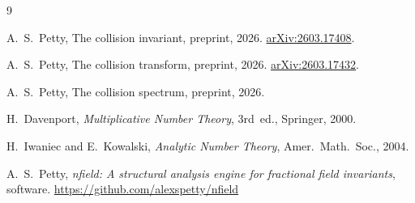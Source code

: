 \documentclass[12pt]{amsart}
\theoremstyle{definition}
\theoremstyle{remark}
\begin{document}
\begin{thebibliography}{9}

A.~S.~Petty,
The collision invariant,
preprint, 2026.
\href{https://arxiv.org/abs/2603.17408}{arXiv:2603.17408}.

A.~S.~Petty,
The collision transform,
preprint, 2026.
\href{https://arxiv.org/abs/2603.17432}{arXiv:2603.17432}.

A.~S.~Petty,
The collision spectrum,
preprint, 2026.

H.~Davenport,
\emph{Multiplicative Number Theory},
3rd~ed., Springer, 2000.

H.~Iwaniec and E.~Kowalski,
\emph{Analytic Number Theory},
Amer.\ Math.\ Soc., 2004.

A.~S.~Petty,
\emph{nfield: A structural analysis engine for fractional
field invariants}, software.
\url{https://github.com/alexspetty/nfield}

\end{thebibliography}
\end{document}
